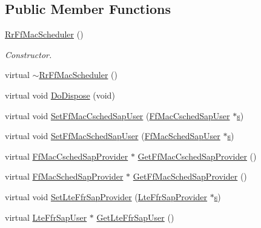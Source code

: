 \subsection*{Public Member Functions}
\begin{DoxyCompactItemize}
\item 
\hyperlink{classns3_1_1RrFfMacScheduler_a20d105a158cad76a4189163619a08147}{Rr\+Ff\+Mac\+Scheduler} ()
\begin{DoxyCompactList}\small\item\em Constructor. \end{DoxyCompactList}\item 
virtual \hyperlink{classns3_1_1RrFfMacScheduler_a06b79cfadad58f0875a349078edee568}{$\sim$\+Rr\+Ff\+Mac\+Scheduler} ()
\item 
virtual void \hyperlink{classns3_1_1RrFfMacScheduler_aced4936f3db961c26a06bb6ed6c4a7bb}{Do\+Dispose} (void)
\item 
virtual void \hyperlink{classns3_1_1RrFfMacScheduler_a4033ff9e739ef22f4db6def41d0a593f}{Set\+Ff\+Mac\+Csched\+Sap\+User} (\hyperlink{classns3_1_1FfMacCschedSapUser}{Ff\+Mac\+Csched\+Sap\+User} $\ast$\hyperlink{generate__test__data__lte__sinr_8m_ad83eeb3a142285d1243a08c6b7026df8}{s})
\item 
virtual void \hyperlink{classns3_1_1RrFfMacScheduler_a31fd5523fa313d24ac1473161bee22f5}{Set\+Ff\+Mac\+Sched\+Sap\+User} (\hyperlink{classns3_1_1FfMacSchedSapUser}{Ff\+Mac\+Sched\+Sap\+User} $\ast$\hyperlink{generate__test__data__lte__sinr_8m_ad83eeb3a142285d1243a08c6b7026df8}{s})
\item 
virtual \hyperlink{classns3_1_1FfMacCschedSapProvider}{Ff\+Mac\+Csched\+Sap\+Provider} $\ast$ \hyperlink{classns3_1_1RrFfMacScheduler_a4a62ba6e68b80f0ffa649a03e0c7ffae}{Get\+Ff\+Mac\+Csched\+Sap\+Provider} ()
\item 
virtual \hyperlink{classns3_1_1FfMacSchedSapProvider}{Ff\+Mac\+Sched\+Sap\+Provider} $\ast$ \hyperlink{classns3_1_1RrFfMacScheduler_a8109700158d037f0f4197d124b62438f}{Get\+Ff\+Mac\+Sched\+Sap\+Provider} ()
\item 
virtual void \hyperlink{classns3_1_1RrFfMacScheduler_a7b6d8b8371d4a8962891a6da503dc899}{Set\+Lte\+Ffr\+Sap\+Provider} (\hyperlink{classns3_1_1LteFfrSapProvider}{Lte\+Ffr\+Sap\+Provider} $\ast$\hyperlink{generate__test__data__lte__sinr_8m_ad83eeb3a142285d1243a08c6b7026df8}{s})
\item 
virtual \hyperlink{classns3_1_1LteFfrSapUser}{Lte\+Ffr\+Sap\+User} $\ast$ \hyperlink{classns3_1_1RrFfMacScheduler_a78596711e636acbb22849b6ec3042097}{Get\+Lte\+Ffr\+Sap\+User} ()

\end{DoxyCompactItemize}
